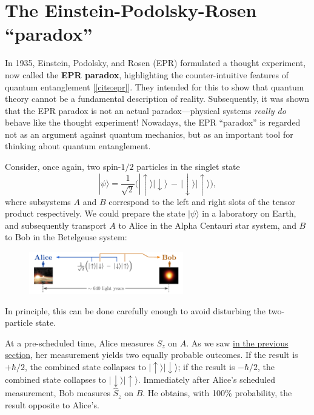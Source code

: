 \documentclass[prx,12pt]{revtex4-2}
\begin{document}
\section{The Einstein-Podolsky-Rosen ``paradox''}

In 1935, Einstein, Podolsky, and Rosen (EPR) formulated a thought
experiment, now called the \textbf{EPR paradox}, highlighting the
counter-intuitive features of quantum entanglement [\ref{cite:epr}].
They intended for this to show that quantum theory cannot be a
fundamental description of reality.  Subsequently, it was shown that
the EPR paradox is not an actual paradox---physical systems
\textit{really do} behave like the thought experiment!  Nowadays, the
EPR ``paradox'' is regarded not as an argument against quantum
mechanics, but as an important tool for thinking about quantum
entanglement.

Consider, once again, two spin-$1/2$ particles in the singlet state
\begin{equation}
  |\psi\rangle = \frac{1}{\sqrt{2}} \Big(|\!\uparrow\rangle|\!\downarrow\rangle \,-\, |\!\downarrow\rangle|\!\uparrow\rangle\Big),
  \label{eprsinglet}
\end{equation}
where subsystems $A$ and $B$ correspond to the left and right slots of
the tensor product respectively.  We could prepare the state
$|\psi\rangle$ in a laboratory on Earth, and subsequently transport
$A$ to Alice in the Alpha Centauri star system, and $B$ to Bob in the
Betelgeuse system:

\begin{figure}[h]
  \centering\includegraphics[width=0.6\textwidth]{epr}
\end{figure}

\noindent
In principle, this can be done carefully enough to avoid disturbing
the two-particle state.

At a pre-scheduled time, Alice measures $S_z$ on $A$.  As we saw
\hyperref[box:eproutcomes]{in the previous section}, her measurement
yields two equally probable outcomes.  If the result is $+\hbar/2$,
the combined state collapses to $|\!\uparrow\rangle
|\!\downarrow\rangle$; if the result is $-\hbar/2$, the combined state
collapses to $|\!\downarrow\rangle|\!\uparrow\rangle$.  Immediately
after Alice's scheduled measurement, Bob measures $\hat{S}_z$ on $B$.
He obtains, with 100\% probability, the result opposite to Alice's.
\end{document}
